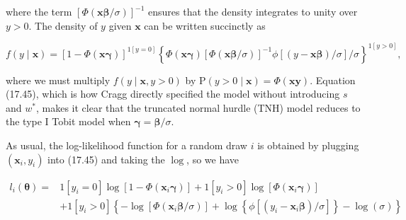 \documentclass[10pt]{article}
\begin{document}
where the term $[\Phi(\mathbf{x} \boldsymbol{\beta} / \sigma)]^{-1}$ ensures that the density integrates to unity over $y>0$. The density of $y$ given $\mathbf{x}$ can be written succinctly as


\begin{equation*}
f(y \mid \mathbf{x})=[1-\Phi(\mathbf{x} \boldsymbol{\gamma})]^{1[y=0]}\left\{\Phi(\mathbf{x} \boldsymbol{\gamma})[\Phi(\mathbf{x} \boldsymbol{\beta} / \sigma)]^{-1} \phi[(y-\mathbf{x} \boldsymbol{\beta}) / \sigma] / \sigma\right\}^{1[y>0]}, \tag{17.45}
\end{equation*}


where we must multiply $f(y \mid \mathbf{x}, y>0)$ by $\mathrm{P}(y>0 \mid \mathbf{x})=\Phi(\mathbf{x} \boldsymbol{y})$. Equation (17.45), which is how Cragg directly specified the model without introducing $s$ and $w^{*}$, makes it clear that the truncated normal hurdle (TNH) model reduces to the type I Tobit model when $\boldsymbol{\gamma}=\boldsymbol{\beta} / \sigma$.

As usual, the log-likelihood function for a random draw $i$ is obtained by plugging $\left(\mathbf{x}_{i}, y_{i}\right)$ into (17.45) and taking the $\log$, so we have

$$
\begin{aligned}
l_{i}(\boldsymbol{\theta})= & 1\left[y_{i}=0\right] \log \left[1-\Phi\left(\mathbf{x}_{i} \boldsymbol{\gamma}\right)\right]+1\left[y_{i}>0\right] \log \left[\Phi\left(\mathbf{x}_{i} \boldsymbol{\gamma}\right)\right] \\
& +1\left[y_{i}>0\right]\left\{-\log \left[\Phi\left(\mathbf{x}_{i} \boldsymbol{\beta} / \sigma\right)\right]+\log \left\{\phi\left[\left(y_{i}-\mathbf{x}_{i} \boldsymbol{\beta}\right) / \sigma\right]\right\}-\log (\sigma)\right\}
\end{aligned}
$$
\end{document}
